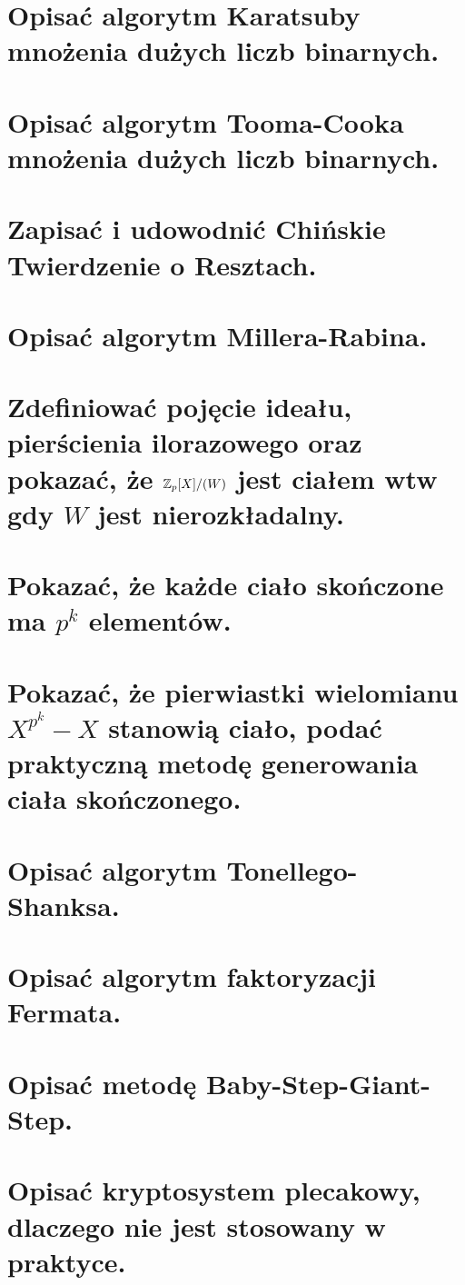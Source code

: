 \section{Opisać algorytm Karatsuby mnożenia dużych liczb binarnych.}


\section{Opisać algorytm Tooma-Cooka mnożenia dużych liczb binarnych.}


\section{Zapisać i udowodnić Chińskie Twierdzenie o Resztach.}


\section{Opisać algorytm Millera-Rabina.}


\section{Zdefiniować pojęcie ideału, pierścienia ilorazowego oraz pokazać, że \( \mathbb{Z}_p[X]/(W) \) jest ciałem wtw gdy \( W \) jest nierozkładalny.}


\section{Pokazać, że każde ciało skończone ma \( p^k \) elementów.}


\section{Pokazać, że pierwiastki wielomianu \( X^{p^k} - X \) stanowią ciało, podać praktyczną metodę generowania ciała skończonego.}
%


\section{Opisać algorytm Tonellego-Shanksa.}


\section{Opisać algorytm faktoryzacji Fermata.}


\section{Opisać metodę Baby-Step-Giant-Step.}


\section{Opisać kryptosystem plecakowy, dlaczego nie jest stosowany w praktyce.}
